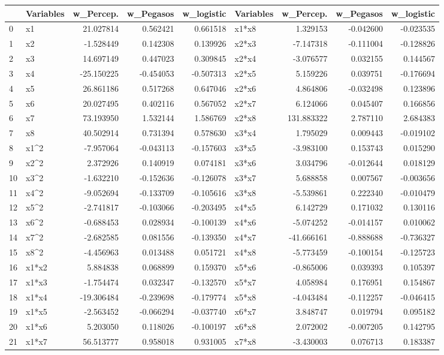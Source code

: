 \begin{tabular}{llrrrlrrr}
\toprule
 & Variables & w_Percep. & w_Pegasos & w_logistic & Variables & w_Percep. & w_Pegasos & w_logistic \\
\midrule
0 & x1 & 21.027814 & 0.562421 & 0.661518 & x1*x8 & 1.329153 & -0.042600 & -0.023535 \\
1 & x2 & -1.528449 & 0.142308 & 0.139926 & x2*x3 & -7.147318 & -0.111004 & -0.128826 \\
2 & x3 & 14.697149 & 0.447023 & 0.309845 & x2*x4 & -3.076577 & 0.032155 & 0.144567 \\
3 & x4 & -25.150225 & -0.454053 & -0.507313 & x2*x5 & 5.159226 & 0.039751 & -0.176694 \\
4 & x5 & 26.861186 & 0.517268 & 0.647046 & x2*x6 & 4.864806 & -0.032498 & 0.123896 \\
5 & x6 & 20.027495 & 0.402116 & 0.567052 & x2*x7 & 6.124066 & 0.045407 & 0.166856 \\
6 & x7 & 73.193950 & 1.532144 & 1.586769 & x2*x8 & 131.883322 & 2.787110 & 2.684383 \\
7 & x8 & 40.502914 & 0.731394 & 0.578630 & x3*x4 & 1.795029 & 0.009443 & -0.019102 \\
8 & x1^2 & -7.957064 & -0.043113 & -0.157603 & x3*x5 & -3.983100 & 0.153743 & 0.015290 \\
9 & x2^2 & 2.372926 & 0.140919 & 0.074181 & x3*x6 & 3.034796 & -0.012644 & 0.018129 \\
10 & x3^2 & -1.632210 & -0.152636 & -0.126078 & x3*x7 & 5.688858 & 0.007567 & -0.003656 \\
11 & x4^2 & -9.052694 & -0.133709 & -0.105616 & x3*x8 & -5.539861 & 0.222340 & -0.010479 \\
12 & x5^2 & -2.741817 & -0.103066 & -0.203495 & x4*x5 & 6.142729 & 0.171032 & 0.130116 \\
13 & x6^2 & -0.688453 & 0.028934 & -0.100139 & x4*x6 & -5.074252 & -0.014157 & 0.010062 \\
14 & x7^2 & -2.682585 & 0.081556 & -0.139350 & x4*x7 & -41.666161 & -0.888688 & -0.736327 \\
15 & x8^2 & -4.456963 & 0.013488 & 0.051721 & x4*x8 & -5.773459 & -0.100154 & -0.125723 \\
16 & x1*x2 & 5.884838 & 0.068899 & 0.159370 & x5*x6 & -0.865006 & 0.039393 & 0.105397 \\
17 & x1*x3 & -1.754474 & 0.032347 & -0.132570 & x5*x7 & 4.058984 & 0.176951 & 0.154867 \\
18 & x1*x4 & -19.306484 & -0.239698 & -0.179774 & x5*x8 & -4.043484 & -0.112257 & -0.046415 \\
19 & x1*x5 & -2.563452 & -0.066294 & -0.037740 & x6*x7 & 3.848747 & 0.019794 & 0.095182 \\
20 & x1*x6 & 5.203050 & 0.118026 & -0.100197 & x6*x8 & 2.072002 & -0.007205 & 0.142795 \\
21 & x1*x7 & 56.513777 & 0.958018 & 0.931005 & x7*x8 & -3.430003 & 0.076713 & 0.183387 \\
\bottomrule
\end{tabular}
